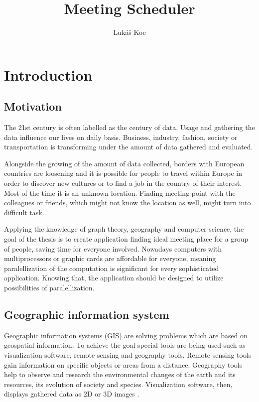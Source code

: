 \documentclass[thesis=M,english]{FITthesis}[2012/10/20]
\title{Meeting Scheduler}
\author{Luk{\' a}{\v s} Koc} %
\begin{document}

\chapter{Introduction}

\section{Motivation}
The 21st century is often labelled as the century of data. Usage and gathering the data influence our lives on daily basis. Business, industry, fashion, society or transportation is transforming under the amount of data gathered and evaluated. 

Alongside the growing of the amount of data collected, borders with European countries are loosening and it is possible for people to travel within Europe in order to discover new cultures or to find a job in the country of their interest. Most of the time it is an unknown location. Finding meeting point with the colleagues or friends, which might not know the location as well, might turn into difficult task.

Applying the knowledge of graph theory, geography and computer science, the goal of the thesis is to create application finding ideal meeting place for a group of people, saving time for everyone involved.
Nowadays computers with multiprocessors or graphic cards are affordable for everyone, meaning paralellization of the computation is significant for every sophisticated application. Knowing that, the application should be designed to utilize possibilities of paralellization.

\section{Geographic information system}
Geographic information systems (GIS) are solving problems which are based on geospatial information. To achieve the goal special tools are being used such as visualization software, remote sensing and geography tools. Remote sensing tools gain information on specific objects or areas from a distance. Geography tools help to observe and research the environmental changes of the earth and its resources, its evolution of society and species. Visualization software, then, displays gathered data as 2D or 3D images \cite{Chen10}.
\end{document}
